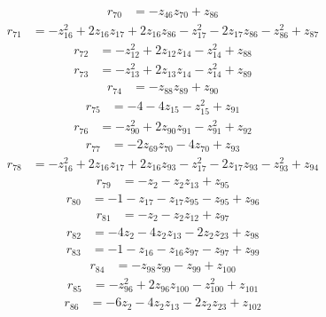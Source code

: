 \begin{align*}
r_{70} &=-z_{46}z_{70}+z_{86}
\end{align*}
\begin{align*}
r_{71} &=-z_{16}^{2}+2z_{16}z_{17}+2z_{16}z_{86}-z_{17}^{2}-2z_{17}z_{86}-z_{86}^{2}+z_{87}
\end{align*}
\begin{align*}
r_{72} &=-z_{12}^{2}+2z_{12}z_{14}-z_{14}^{2}+z_{88}
\end{align*}
\begin{align*}
r_{73} &=-z_{13}^{2}+2z_{13}z_{14}-z_{14}^{2}+z_{89}
\end{align*}
\begin{align*}
r_{74} &=-z_{88}z_{89}+z_{90}
\end{align*}
\begin{align*}
r_{75} &=-4-4z_{15}-z_{15}^{2}+z_{91}
\end{align*}
\begin{align*}
r_{76} &=-z_{90}^{2}+2z_{90}z_{91}-z_{91}^{2}+z_{92}
\end{align*}
\begin{align*}
r_{77} &=-2z_{69}z_{70}-4z_{70}+z_{93}
\end{align*}
\begin{align*}
r_{78} &=-z_{16}^{2}+2z_{16}z_{17}+2z_{16}z_{93}-z_{17}^{2}-2z_{17}z_{93}-z_{93}^{2}+z_{94}
\end{align*}
\begin{align*}
r_{79} &=-z_{2}-z_{2}z_{13}+z_{95}
\end{align*}
\begin{align*}
r_{80} &=-1-z_{17}-z_{17}z_{95}-z_{95}+z_{96}
\end{align*}
\begin{align*}
r_{81} &=-z_{2}-z_{2}z_{12}+z_{97}
\end{align*}
\begin{align*}
r_{82} &=-4z_{2}-4z_{2}z_{13}-2z_{2}z_{23}+z_{98}
\end{align*}
\begin{align*}
r_{83} &=-1-z_{16}-z_{16}z_{97}-z_{97}+z_{99}
\end{align*}
\begin{align*}
r_{84} &=-z_{98}z_{99}-z_{99}+z_{100}
\end{align*}
\begin{align*}
r_{85} &=-z_{96}^{2}+2z_{96}z_{100}-z_{100}^{2}+z_{101}
\end{align*}
\begin{align*}
r_{86} &=-6z_{2}-4z_{2}z_{13}-2z_{2}z_{23}+z_{102}
\end{align*}

